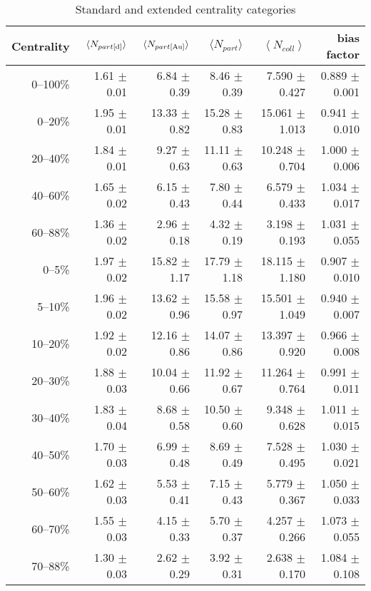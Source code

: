 \documentclass[10pt]{article}
\begin{document}
\begin{table}[ht]
\caption{Standard and extended centrality categories}
  \begin{tabular}{rrrrrr}
    \hline\hline
    Centrality & $\langle N_{part\rm{[d]}} \rangle$ & $\langle N_{part\rm{[Au]}} \rangle$ & $\langle N_{part} \rangle$ & $\left<N_{coll}\right>$ & bias factor\\
    \hline
    0--100\% & 1.61 $\pm$ 0.01 &  6.84 $\pm$ 0.39 &  8.46 $\pm$ 0.39 &  7.590 $\pm$ 0.427 & 0.889 $\pm$ 0.001\\
    \hline
     0--20\% & 1.95 $\pm$ 0.01 & 13.33 $\pm$ 0.82 & 15.28 $\pm$ 0.83 & 15.061 $\pm$ 1.013 & 0.941 $\pm$ 0.010 \\
    20--40\% & 1.84 $\pm$ 0.01 &  9.27 $\pm$ 0.63 & 11.11 $\pm$ 0.63 & 10.248 $\pm$ 0.704 & 1.000 $\pm$ 0.006 \\
    40--60\% & 1.65 $\pm$ 0.02 &  6.15 $\pm$ 0.43 &  7.80 $\pm$ 0.44 &  6.579 $\pm$ 0.433 & 1.034 $\pm$ 0.017 \\
    60--88\% & 1.36 $\pm$ 0.02 &  2.96 $\pm$ 0.18 &  4.32 $\pm$ 0.19 &  3.198 $\pm$ 0.193 & 1.031 $\pm$ 0.055 \\
    \hline
      0--5\% & 1.97 $\pm$ 0.02 &  15.82 $\pm$ 1.17 &  17.79 $\pm$ 1.18 &  18.115 $\pm$ 1.180 & 0.907 $\pm$ 0.010 \\
     5--10\% & 1.96 $\pm$ 0.02 &  13.62 $\pm$ 0.96 &  15.58 $\pm$ 0.97 &  15.501 $\pm$ 1.049 & 0.940 $\pm$ 0.007 \\
    10--20\% & 1.92 $\pm$ 0.02 &  12.16 $\pm$ 0.86 &  14.07 $\pm$ 0.86 &  13.397 $\pm$ 0.920 & 0.966 $\pm$ 0.008 \\
    20--30\% & 1.88 $\pm$ 0.03 &  10.04 $\pm$ 0.66 &  11.92 $\pm$ 0.67 &  11.264 $\pm$ 0.764 & 0.991 $\pm$ 0.011 \\
    30--40\% & 1.83 $\pm$ 0.04 &   8.68 $\pm$ 0.58 &  10.50 $\pm$ 0.60 &   9.348 $\pm$ 0.628 & 1.011 $\pm$ 0.015 \\
    40--50\% & 1.70 $\pm$ 0.03 &   6.99 $\pm$ 0.48 &   8.69 $\pm$ 0.49 &   7.528 $\pm$ 0.495 & 1.030 $\pm$ 0.021 \\
    50--60\% & 1.62 $\pm$ 0.03 &   5.53 $\pm$ 0.41 &   7.15 $\pm$ 0.43 &   5.779 $\pm$ 0.367 & 1.050 $\pm$ 0.033 \\
    60--70\% & 1.55 $\pm$ 0.03 &   4.15 $\pm$ 0.33 &   5.70 $\pm$ 0.37 &   4.257 $\pm$ 0.266 & 1.073 $\pm$ 0.055 \\
    70--88\% & 1.30 $\pm$ 0.03 &   2.62 $\pm$ 0.29 &   3.92 $\pm$ 0.31 &   2.638 $\pm$ 0.170 & 1.084 $\pm$ 0.108 \\
    \hline\hline
  \end{tabular}
  \label{Cent4}
\end{table}
\end{document}
